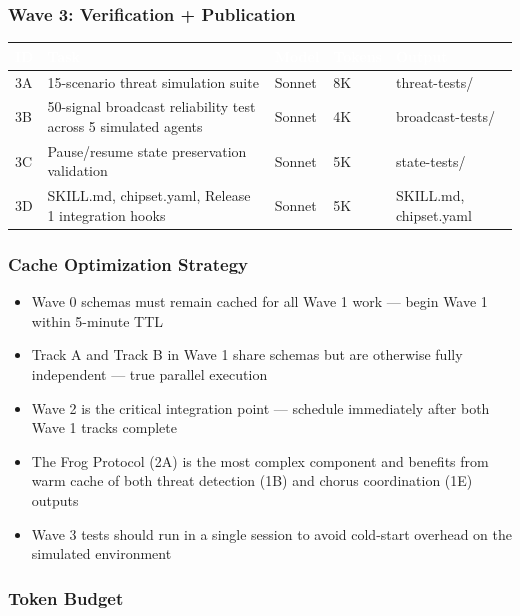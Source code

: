 \documentclass[11pt,letterpaper]{article}
\newcommand{\tableheader}[1]{\textbf{\sffamily\textcolor{white}{#1}}}
\begin{document}
\subsubsection{Wave 3: Verification + Publication}

\begin{center}
\begin{tabularx}{\textwidth}{C{0.8cm}L{3.5cm}L{1.5cm}C{1.2cm}X}
\toprule
{}
\tableheader{ID} & \tableheader{Task} & \tableheader{Model} & \tableheader{Tokens} & \tableheader{Output} \\
\midrule
3A & 15-scenario threat simulation suite & Sonnet & 8K & threat-tests/ \\
3B & 50-signal broadcast reliability test across 5 simulated agents & Sonnet & 4K & broadcast-tests/ \\
3C & Pause/resume state preservation validation & Sonnet & 5K & state-tests/ \\
3D & SKILL.md, chipset.yaml, Release 1 integration hooks & Sonnet & 5K & SKILL.md, chipset.yaml \\
\bottomrule
\end{tabularx}
\end{center}

\subsubsection{Cache Optimization Strategy}

\begin{itemize}[leftmargin=2em]
\item Wave 0 schemas must remain cached for all Wave 1 work --- begin Wave 1 within 5-minute TTL
\item Track A and Track B in Wave 1 share schemas but are otherwise fully independent --- true parallel execution
\item Wave 2 is the critical integration point --- schedule immediately after both Wave 1 tracks complete
\item The Frog Protocol (2A) is the most complex component and benefits from warm cache of both threat detection (1B) and chorus coordination (1E) outputs
\item Wave 3 tests should run in a single session to avoid cold-start overhead on the simulated environment
\end{itemize}

\subsubsection{Token Budget}
\end{document}
